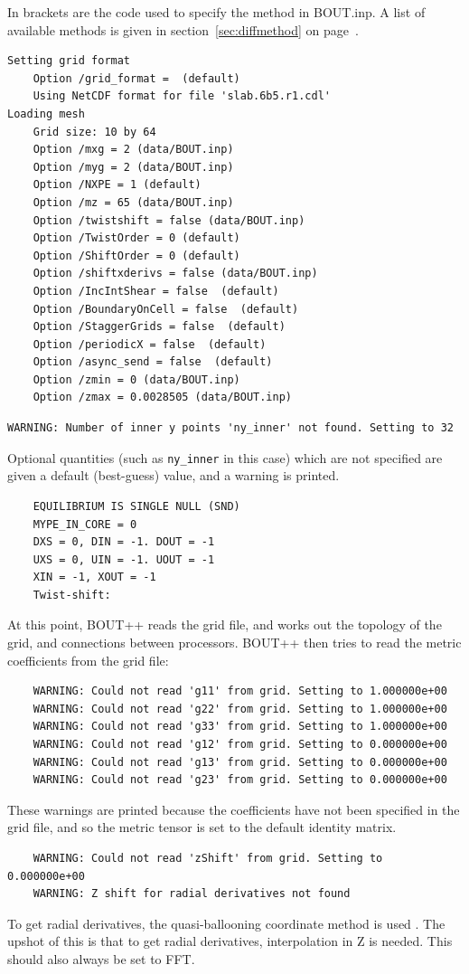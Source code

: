 \documentclass[12pt]{article}
\newcommand{\code}[1]{\texttt{#1}}
\begin{document}
In brackets are the code used to specify the method in BOUT.inp. A list of
available methods is given in section~\ref{sec:diffmethod} on
page~\pageref{sec:diffmethod}.

%
\begin{verbatim}
Setting grid format
	Option /grid_format =  (default)
	Using NetCDF format for file 'slab.6b5.r1.cdl'
Loading mesh
	Grid size: 10 by 64
	Option /mxg = 2 (data/BOUT.inp)
	Option /myg = 2 (data/BOUT.inp)
	Option /NXPE = 1 (default)
	Option /mz = 65 (data/BOUT.inp)
	Option /twistshift = false (data/BOUT.inp)
	Option /TwistOrder = 0 (default)
	Option /ShiftOrder = 0 (default)
	Option /shiftxderivs = false (data/BOUT.inp)
	Option /IncIntShear = false  (default)
	Option /BoundaryOnCell = false  (default)
	Option /StaggerGrids = false  (default)
	Option /periodicX = false  (default)
	Option /async_send = false  (default)
	Option /zmin = 0 (data/BOUT.inp)
	Option /zmax = 0.0028505 (data/BOUT.inp)
\end{verbatim}
%
\begin{verbatim}
WARNING: Number of inner y points 'ny_inner' not found. Setting to 32
\end{verbatim}
%
Optional quantities (such as \code{ny\_inner} in this case) which are not
specified are given a default (best-guess) value, and a warning is printed.
%
\begin{verbatim}
	EQUILIBRIUM IS SINGLE NULL (SND)
	MYPE_IN_CORE = 0
	DXS = 0, DIN = -1. DOUT = -1
	UXS = 0, UIN = -1. UOUT = -1
	XIN = -1, XOUT = -1
	Twist-shift:
\end{verbatim}
%
At this point, BOUT++ reads the grid file, and works out the topology of the
grid, and connections between processors.  BOUT++ then tries to read the metric
coefficients from the grid file:
%
\begin{verbatim}
	WARNING: Could not read 'g11' from grid. Setting to 1.000000e+00
	WARNING: Could not read 'g22' from grid. Setting to 1.000000e+00
	WARNING: Could not read 'g33' from grid. Setting to 1.000000e+00
	WARNING: Could not read 'g12' from grid. Setting to 0.000000e+00
	WARNING: Could not read 'g13' from grid. Setting to 0.000000e+00
	WARNING: Could not read 'g23' from grid. Setting to 0.000000e+00
\end{verbatim}
%
These warnings are printed because the coefficients have not been specified in
the grid file, and so the metric tensor is set to the default identity matrix.

%
\begin{verbatim}
	WARNING: Could not read 'zShift' from grid. Setting to 0.000000e+00
	WARNING: Z shift for radial derivatives not found
\end{verbatim}
%
To get radial derivatives, the quasi-ballooning coordinate method is used
.  The upshot of this is that to get radial derivatives, interpolation in Z is
needed. This should also always be set to FFT.
\end{document}
